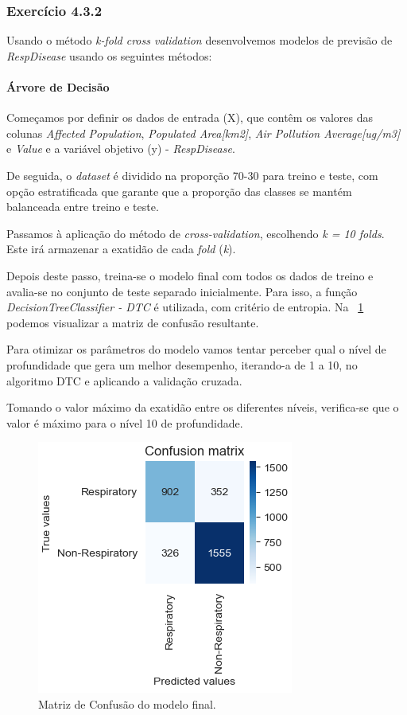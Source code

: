 \documentclass[conference]{IEEEtran}
\begin{document}
\medskip

\subsubsection{\textbf{Exercício 4.3.2}}

Usando o método \textit{k-fold cross validation} desenvolvemos modelos de previsão de \textit{RespDisease} usando os seguintes métodos:

\medskip

\paragraph{Árvore de Decisão}

Começamos por definir os dados de entrada (X), que contêm os valores das colunas \textit{Affected Population}, \textit{Populated Area[km2]}, \textit{Air Pollution Average[ug/m3]} e \textit{Value}  e a variável objetivo (y) - \textit{RespDisease}.

De seguida, o \textit{dataset} é dividido na proporção 70-30 para treino e teste, com opção estratificada que garante que a proporção das classes se mantém balanceada entre treino e teste.

Passamos à aplicação do método de \textit{cross-validation}, escolhendo \textit{k = 10 folds}. Este irá armazenar a exatidão de cada \textit{fold} (\textit{k}).

Depois deste passo, treina-se o modelo final com todos os dados de treino e avalia-se no conjunto de teste separado inicialmente. Para isso, a função \textit{DecisionTreeClassifier - DTC} é utilizada, com critério de entropia. Na \figurename~\ref{fig:arvoreDecisaoCM} podemos visualizar a matriz de confusão resultante.

Para otimizar os parâmetros do modelo vamos tentar perceber qual o nível de profundidade que gera um melhor desempenho, iterando-a de 1 a 10, no algoritmo DTC e aplicando a validação cruzada.

Tomando o valor máximo da exatidão entre os diferentes níveis, verifica-se que o valor é máximo para o nível 10 de profundidade.

\begin{figure}[h]
	\centering
	\includegraphics[width=0.5\linewidth]{arvoreDecisaoCM}
	\caption{Matriz de Confusão do modelo final.}
	\label{fig:arvoreDecisaoCM}
\end{figure}
\end{document}
